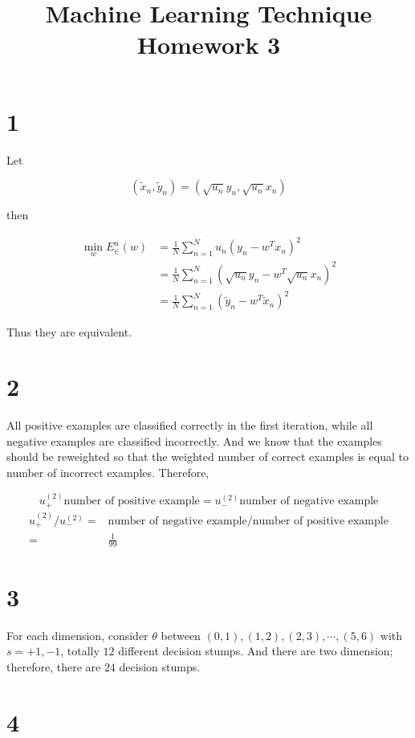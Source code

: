 \documentclass[fleqn,a4paper,12pt]{article}
\title{Machine Learning Technique Homework 3}
\date{}
\begin{document}
\maketitle
\thispagestyle{fancy}

\section*{1}

Let

$$(\tilde{x}_n, \tilde{y}_n) = (\sqrt{u_n}y_n, \sqrt{u_n}x_n)$$

then

\begin{align*}
  \min_{w} E^u_{\in}(w)
  &= \frac{1}{N} \sum_{n=1}^N u_n(y_n - w^Tx_n)^2 \\
  &= \frac{1}{N} \sum_{n=1}^N (\sqrt{u_n}y_n - w^T \sqrt{u_n} x_n)^2 \\
  &= \frac{1}{N} \sum_{n=1}^N (\tilde{y}_n - w^T \tilde{x}_n)^2
\end{align*}

Thus they are equivalent.


\section*{2}

All positive examples are classified correctly in the first iteration, while all negative examples are classified incorrectly. And we know that the examples should be reweighted so that the weighted number of correct examples is equal to number of incorrect examples. Therefore,

$$u^{(2)}_{+}  \text{number of positive example} =  u^{(2)}_{-} \text{number of negative example}$$
\begin{align*}
  u^{(2)}_{+} / u^{(2)}_{-}
  =&   \text{number of negative example} / \text{number of positive example} \\
  =& \frac{1}{99}
\end{align*}


\section*{3}

For each dimension, consider $\theta$ between $(0, 1), (1, 2), (2, 3), \cdots, (5, 6)$ with $s = {+1, -1}$, totally $12$ different decision stumps. And there are two dimension; therefore, there are $24$ decision stumps.

\section*{4}
\end{document}
